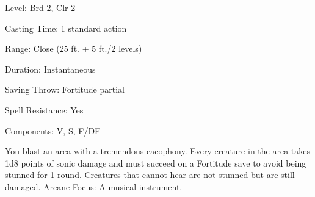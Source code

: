 
\begin{description*}
\item[Level:] Brd 2, Clr 2
\item[Casting Time:] 1 standard action
\item[Range:] Close (25 ft. + 5 ft./2 levels)
\item[Duration:] Instantaneous
\item[Saving Throw:] Fortitude partial
\item[Spell Resistance:] Yes
\item[Components:] V, S, F/DF
\end{description*}

You blast an area with a tremendous cacophony. Every creature in the area takes
1d8 points of sonic damage and must succeed on a Fortitude save to avoid being
stunned for 1 round.
Creatures that cannot hear are not stunned but are still damaged.
Arcane Focus: A musical instrument.